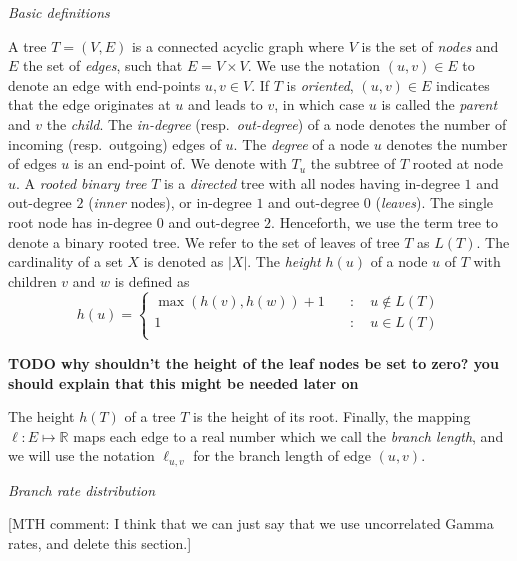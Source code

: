 \documentclass{llncs}
\newcommand{\mthcomment}[1]{{[\color{red}MTH comment: #1]}}
\renewcommand{\subsection}[1]{%
\bigskip
\begin{center}
\begin{large}
\normalfont\itshape #1
\end{large}
\end{center}}
\begin{document}
\subsection{Basic definitions}

%
A tree $T=(V,E)$ is a connected acyclic graph where $V$ is the set of {\em
nodes} and $E$ the set of {\em edges}, such that $E = V\times V$. We use the
notation $(u,v) \in E$ to denote an edge with end-points $u,v \in V$. If $T$ is
{\em oriented}, $(u,v) \in E$ indicates that the edge originates at $u$ and leads
to $v$, in which case $u$ is called the {\em parent} and $v$ the {\em child}.
The {\em in-degree} (resp.~{\em out-degree}) of a node denotes the
number of incoming (resp.~outgoing) edges of $u$. The
{\em degree} of a node $u$ denotes the number of edges $u$ is an end-point of.
We denote with $T_u$ the subtree of $T$ rooted at node $u$.  A {\em
rooted binary tree} $T$ is a {\em directed} tree with all nodes having
in-degree $1$ and out-degree $2$ ({\em inner} nodes), or in-degree $1$ and out-degree
$0$ ({\em leaves}). The single root node has in-degree $0$ and out-degree $2$.  
Henceforth, we use the term tree to denote a
binary rooted tree.  We refer to the set of leaves of tree $T$ as $L(T)$.  The
cardinality of a set $X$ is denoted as $|X|$. The {\em height} $h(u)$ of a node
$u$ of $T$ with children $v$ and $w$ is defined as 
%
\[ h(u) = \left\{ \begin{array}{ll}
\max(h(v), h(w)) + 1 & \quad : \quad u \notin L(T)\\
1                    & \quad : \quad u    \in L(T)\\
\end{array}\right. \] 

{\bf TODO why shouldn't the height of the leaf nodes be set to zero? you should explain that this might be needed later on}

The height $h(T)$ of a tree $T$ is the height of its root. Finally, the mapping $\ell : E \mapsto \mathbb{R}$ maps
each edge to a real number which we call the {\em branch length}, and we will use the notation $\ell_{u,v}$ for
the branch length of edge $(u,v)$.

\subsection{Branch rate distribution}

\mthcomment{I think that we can just say that we use uncorrelated Gamma rates, and delete this section.}
\end{document}
